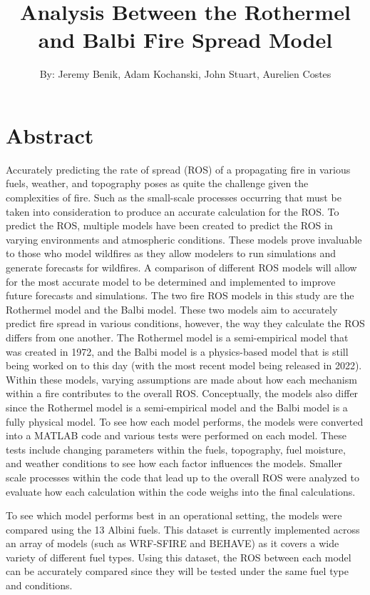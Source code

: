 \documentclass{article}
\begin{document}
\title{Analysis Between the Rothermel and Balbi Fire Spread Model}
\author{By: Jeremy Benik, Adam Kochanski, John Stuart, Aurelien Costes}
\maketitle
\section{Abstract}
Accurately predicting the rate of spread (ROS) of a propagating fire in various fuels, weather, and topography poses as quite the challenge given the complexities of fire. Such as the small-scale processes occurring that must be taken into consideration to produce an accurate calculation for the ROS. To predict the ROS, multiple models have been created to predict the ROS in varying environments and atmospheric conditions.
These models prove invaluable to those who model wildfires as they allow modelers to run simulations and generate forecasts for wildfires. A comparison of different ROS models will allow for the most accurate model to be determined and implemented to improve future forecasts and simulations. The two fire ROS models in this study are the Rothermel model and the Balbi model. These two models aim to accurately predict fire spread in various conditions, however, the way they calculate the ROS differs from one another. The Rothermel model is a semi-empirical model that was created in 1972, and the Balbi model is a physics-based model that is still being worked on to this day (with the most recent model being released in 2022). Within these models, varying assumptions are made about how each mechanism within a fire contributes to the overall ROS. Conceptually, the models also differ since the Rothermel model is a semi-empirical model and the Balbi model is a fully physical model. To see how each model performs, the models were converted into a MATLAB code and various tests were performed on each model. These tests include changing parameters within the fuels, topography, fuel moisture, and weather conditions to see how each factor influences the models. Smaller scale processes within the code that lead up to the overall ROS were analyzed to evaluate how each calculation within the code weighs into the final calculations.

To see which model performs best in an operational setting, the models were compared using the 13 Albini fuels. This dataset is currently implemented across an array of models (such as WRF-SFIRE and BEHAVE) as it covers a wide variety of different fuel types. Using this dataset, the ROS between each model can be accurately compared since they will be tested under the same fuel type and conditions. 
\end{document}

